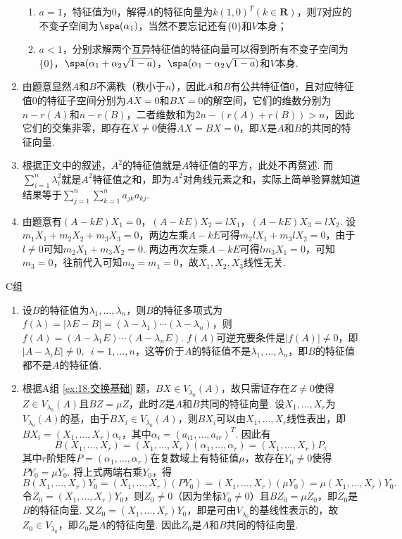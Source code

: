 \begin{enumerate}
\begin{enumerate}
              \item $a=1$，特征值为0，解得$A$的特征向量为$k(1,0)^T(k\in\mathbf{R})$，则$T$对应的不变子空间为$\spa(\alpha_1)$，当然不要忘记还有$\{0\}$和$V$本身；

              \item $a<1$，分别求解两个互异特征值的特征向量可以得到所有不变子空间为$\{0\}$，$\spa(\alpha_1+\alpha_2\sqrt{1-a})$，$\spa(\alpha_1-\alpha_2\sqrt{1-a})$和$V$本身.
          \end{enumerate}

    \item 由题意显然$A$和$B$不满秩（秩小于$n$），因此$A$和$B$有公共特征值0，且对应特征值0的特征子空间分别为$AX=0$和$BX=0$的解空间，它们的维数分别为$n-r(A)$和$n-r(B)$，二者维数和为$2n-(r(A)+r(B))>n$，因此它们的交集非零，即存在$X\neq 0$使得$AX=BX=0$，即$X$是$A$和$B$的共同的特征向量.

    \item 根据正文中的叙述，$A^2$的特征值就是$A$特征值的平方，此处不再赘述. 而$\displaystyle\sum_{i=1}^{n}\lambda_i^2$就是$A^2$特征值之和，即为$A^2$对角线元素之和，实际上简单验算就知道结果等于$\displaystyle\sum_{j=1}^{n}\displaystyle\sum_{k=1}^{n}a_{jk}a_{kj}$.

    \item 由题意有$(A-kE)X_1=0$，$(A-kE)X_2=lX_1$，$(A-kE)X_3=lX_2$. 设$m_1X_1+m_2X_2+m_3X_3=0$，两边左乘$A-kE$可得$m_2lX_1+m_3lX_2=0$，由于$l\neq 0$可知$m_2X_1+m_3X_2=0$. 两边再次左乘$A-kE$可得$lm_3X_1=0$，可知$m_3=0$，往前代入可知$m_2=m_1=0$，故$X_1,X_2,X_3$线性无关.
\end{enumerate}

\centerline{\heiti C组}
\begin{enumerate}
    \item 设$B$的特征值为$\lambda_1,\ldots,\lambda_n$，则$B$的特征多项式为$f(\lambda)=|\lambda E-B|=(\lambda-\lambda_1)\cdots(\lambda-\lambda_n)$，则$f(A)=(A-\lambda_1E)\cdots(A-\lambda_nE)$. $f(A)$可逆充要条件是$|f(A)|\neq 0$，即$|A-\lambda_iE|\neq 0,\enspace i=1,\ldots,n$，这等价于$A$的特征值不是$\lambda_1,\ldots,\lambda_n$，即$B$的特征值都不是$A$的特征值.

    \item 根据A组 \ref*{ex:18:交换基础} 题，$BX\in V_{\lambda_0}(A)$，故只需证存在$Z\neq 0$使得$Z\in V_{\lambda_0}(A)$且$BZ=\mu Z$，此时$Z$是$A$和$B$共同的特征向量. 设$X_1,\ldots,X_r$为$V_{\lambda_0}(A)$的基，由于$BX_i\in V_{\lambda_0}(A)$，则$BX_i$可以由$X_1,\ldots,X_r$线性表出，即$BX_i=(X_1,\ldots,X_r)\alpha_i$，其中$\alpha_i=(a_{i1},\ldots,a_{ir})^T$. 因此有
          \[B(X_1,\ldots,X_r)=(X_1,\ldots,X_r)(\alpha_1,\ldots,\alpha_r)=(X_1,\ldots,X_r)P,\]
          其中$r$阶矩阵$P=(\alpha_1,\ldots,\alpha_r)$在复数域上有特征值$\mu$，故存在$Y_0\neq 0$使得$PY_0=\mu Y_0$. 将上式两端右乘$Y_0$，得
          \[B(X_1,\ldots,X_r)Y_0=(X_1,\ldots,X_r)(PY_0)=(X_1,\ldots,X_r)(\mu Y_0)=\mu(X_1,\ldots,X_r)Y_0.\]
          令$Z_0=(X_1,\ldots,X_r)Y_0$，则$Z_0\neq 0$（因为坐标$Y_0\neq 0$）且$BZ_0=\mu Z_0$，即$Z_0$是$B$的特征向量. 又$Z_0=(X_1,\ldots,X_r)Y_0$，即是可由$V_{\lambda_0}$的基线性表示的，故$Z_0\in V_{\lambda_0}$，即$Z_0$是$A$的特征向量. 因此$Z_0$是$A$和$B$共同的特征向量.
\end{enumerate}

\clearpage
